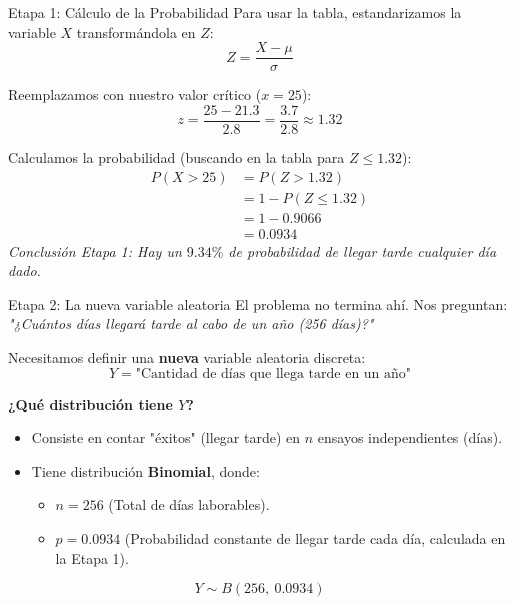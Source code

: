 \documentclass[11pt, aspectratio=169]{beamer}
\begin{document}
\begin{frame}{Etapa 1: Cálculo de la Probabilidad}
    Para usar la tabla, estandarizamos la variable $X$ transformándola en $Z$:
    \begin{equation*}
        Z = \frac{X - \mu}{\sigma}
    \end{equation*}
    
    Reemplazamos con nuestro valor crítico ($x = 25$):
    \begin{equation*}
        z = \frac{25 - 21.3}{2.8} = \frac{3.7}{2.8} \approx 1.32
    \end{equation*}
    
    Calculamos la probabilidad (buscando en la tabla para $Z \le 1.32$):
    \begin{align*}
        P(X > 25) &= P(Z > 1.32) \\
                  &= 1 - P(Z \le 1.32) \\
                  &= 1 - 0.9066 \\
                  &= \mathbf{0.0934}
    \end{align*}
    \textit{Conclusión Etapa 1: Hay un $9.34\%$ de probabilidad de llegar tarde cualquier día dado.}
\end{frame}

\begin{frame}{Etapa 2: La nueva variable aleatoria}
    El problema no termina ahí. Nos preguntan: \textit{"¿Cuántos días llegará tarde al cabo de un año (256 días)?"}
    
    \vspace{0.3cm}
    Necesitamos definir una \textbf{nueva} variable aleatoria discreta:
    \begin{equation*}
        Y = \text{"Cantidad de días que llega tarde en un año"}
    \end{equation*}
    
    \textbf{¿Qué distribución tiene $Y$?}
    \begin{itemize}
        \item Consiste en contar "éxitos" (llegar tarde) en $n$ ensayos independientes (días).
        \item Tiene distribución \textbf{Binomial}, donde:
        \begin{itemize}
            \item $n = 256$ (Total de días laborables).
            \item $p = 0.0934$ (Probabilidad constante de llegar tarde cada día, calculada en la Etapa 1).
        \end{itemize}
    \end{itemize}
    \begin{equation*}
        Y \sim B(256, \ 0.0934)
    \end{equation*}
\end{frame}
\end{document}
